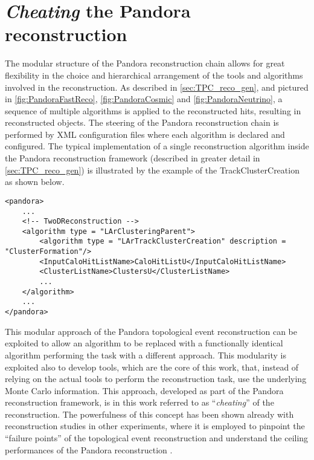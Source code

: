 \section{\emph{Cheating} the Pandora reconstruction} \label{sec:cheatingPandora}

The modular structure of the Pandora reconstruction chain allows for great flexibility in the choice and hierarchical arrangement of the tools and algorithms involved in the reconstruction. As described in \autoref{sec:TPC_reco_gen}, and pictured in \autoref{fig:PandoraFastReco}, \ref{fig:PandoraCosmic} and \ref{fig:PandoraNeutrino}, a sequence of multiple algorithms is applied to the reconstructed hits, resulting in reconstructed objects. The steering of the Pandora reconstruction chain is performed by XML configuration files where each algorithm is declared and configured. The typical implementation of a single reconstruction algorithm inside the Pandora reconstruction framework (described in greater detail in \autoref{sec:TPC_reco_gen}) is illustrated by the example of the TrackClusterCreation as shown below. 

\begin{lstlisting}[style=xmlstyle]
<pandora>
    ...
    <!-- TwoDReconstruction -->
    <algorithm type = "LArClusteringParent">
        <algorithm type = "LArTrackClusterCreation" description = "ClusterFormation"/>
        <InputCaloHitListName>CaloHitListU</InputCaloHitListName>
        <ClusterListName>ClustersU</ClusterListName>
        ...
    </algorithm>
    ...
</pandora>
\end{lstlisting}

This modular approach of the Pandora topological event reconstruction can be exploited to allow an algorithm to be replaced with a functionally identical algorithm performing the task with a different approach. This modularity is exploited also to develop tools, which are the core of this work, that, instead of relying on the actual tools to perform the reconstruction task, use the underlying Monte Carlo information. This approach, developed as part of the Pandora reconstruction framework, is in this work referred to as ``\emph{cheating}'' of the reconstruction. The powerfulness of this concept has been shown already with reconstruction studies in other experiments, where it is employed to pinpoint the ``failure points'' of the topological event reconstruction and understand the ceiling performances of the Pandora reconstruction \cite{Mawby:2023nws, Mawby:2025_FCCee, Nguyen:2023_cheatingPandora}. 

